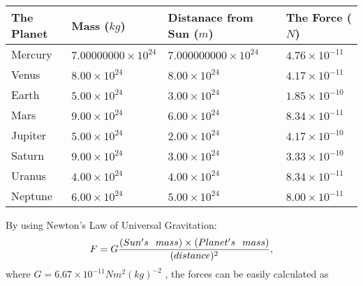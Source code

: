 \documentclass[12pt]{article}
\begin{document}
 
\begin{tabular}{|l|l|l|l|}
\hline
The Planet & Mass ($kg$) & Distanace from Sun ($m$) & The Force ($N$)\\
\hline
Mercury  &
           $ %
7.00000000 \times 10^{24} $   &
             $ %
7.000000000 \times 10^{24} $    & $ %
4.76 \times 10^{-11} $
\\  \hline
Venus    &
           $  %
8.00 \times 10^{24}  $     &
             $ %
8.00 \times 10^{24} $    & $ %
4.17 \times 10^{-11} $
\\  \hline
Earth    &
           $  %
5.00 \times 10^{24}  $     &
             $ %
3.00 \times 10^{24} $    & $ %
1.85 \times 10^{-10} $
\\   \hline
Mars     &
           $  %
9.00 \times 10^{24} $     &
             $ %
6.00 \times 10^{24} $    & $ %
8.34 \times 10^{-11} $
\\   \hline
Jupiter  &
           $  %
5.00 \times 10^{24} $    &
             $ %
2.00 \times 10^{24} $    & $ %
4.17 \times 10^{-10} $
\\  \hline
Saturn   &
           $  %
9.00 \times 10^{24} $    &
             $ %
3.00 \times 10^{24}  $    & $ %
3.33 \times 10^{-10} $
\\  \hline
Uranus   &
           $  %
4.00 \times 10^{24} $    &
             $ %
4.00 \times 10^{24} $    & $ %
8.34 \times 10^{-11} $
\\  \hline
Neptune  &
           $  %
6.00 \times 10^{24} $    &
             $ %
5.00 \times 10^{24} $    & $ %
8.00 \times 10^{-11} $
\\  \hline
 
\end{tabular}
 
 
 
 
 
 
\noindent{}

By using Newton's Law of Universal Gravitation:
\[
F=G \frac{(Sun's \hspace{0.1in} mass) \times (Planet's \hspace{0.1in} mass)} { (distance)^2},
\]
where
$ G= %
6.67 \times 10^{-11} N m^{2}(kg)^{-2}$ , the forces can be easily calculated as
 
\vspace{0.2in}
 
\end{document}
